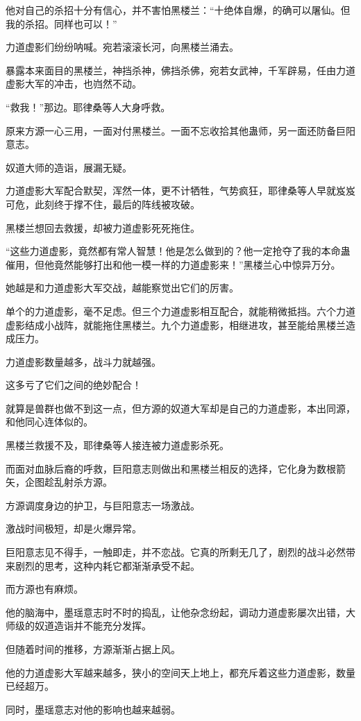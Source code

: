 \begin{this_body}
他对自己的杀招十分有信心，并不害怕黑楼兰：“十绝体自爆，的确可以屠仙。但我的杀招。同样也可以！”

力道虚影们纷纷呐喊。宛若滚滚长河，向黑楼兰涌去。

暴露本来面目的黑楼兰，神挡杀神，佛挡杀佛，宛若女武神，千军辟易，任由力道虚影大军的冲击，也岿然不动。

“救我！”那边。耶律桑等人大身呼救。

原来方源一心三用，一面对付黑楼兰。一面不忘收拾其他蛊师，另一面还防备巨阳意志。

奴道大师的造诣，展漏无疑。

力道虚影大军配合默契，浑然一体，更不计牺牲，气势疯狂，耶律桑等人早就岌岌可危，此刻终于撑不住，最后的阵线被攻破。

黑楼兰想回去救援，却被力道虚影死死拖住。

“这些力道虚影，竟然都有常人智慧！他是怎么做到的？他一定抢夺了我的本命蛊催用，但他竟然能够打出和他一模一样的力道虚影来！”黑楼兰心中惊异万分。

她越是和力道虚影大军交战，越能察觉出它们的厉害。

单个的力道虚影，毫不足虑。但三个力道虚影相互配合，就能稍微抵挡。六个力道虚影结成小战阵，就能拖住黑楼兰。九个力道虚影，相继进攻，甚至能给黑楼兰造成压力。

力道虚影数量越多，战斗力就越强。

这多亏了它们之间的绝妙配合！

就算是兽群也做不到这一点，但方源的奴道大军却是自己的力道虚影，本出同源，和他同心连体似的。

黑楼兰救援不及，耶律桑等人接连被力道虚影杀死。

而面对血脉后裔的呼救，巨阳意志则做出和黑楼兰相反的选择，它化身为数根箭矢，企图趁乱射杀方源。

方源调度身边的护卫，与巨阳意志一场激战。

激战时间极短，却是火爆异常。

巨阳意志见不得手，一触即走，并不恋战。它真的所剩无几了，剧烈的战斗必然带来剧烈的思考，这种内耗它都渐渐承受不起。

而方源也有麻烦。

他的脑海中，墨瑶意志时不时的捣乱，让他杂念纷起，调动力道虚影屡次出错，大师级的奴道造诣并不能充分发挥。

但随着时间的推移，方源渐渐占据上风。

他的力道虚影大军越来越多，狭小的空间天上地上，都充斥着这些力道虚影，数量已经超万。

同时，墨瑶意志对他的影响也越来越弱。


\end{this_body}
